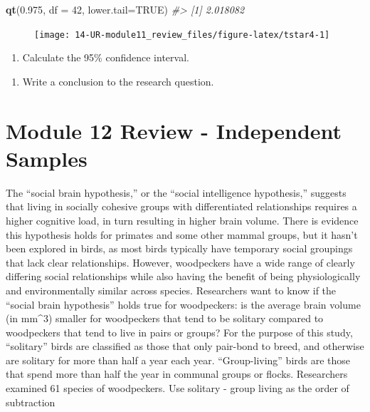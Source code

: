 \documentclass[
]{report}
\newenvironment{Shaded}{\begin{snugshade}}{\end{snugshade}}
\newcommand{\AttributeTok}[1]{\textcolor[rgb]{0.13,0.29,0.53}{#1}}
\newcommand{\CommentTok}[1]{\textcolor[rgb]{0.56,0.35,0.01}{\textit{#1}}}
\newcommand{\ConstantTok}[1]{\textcolor[rgb]{0.56,0.35,0.01}{#1}}
\newcommand{\DecValTok}[1]{\textcolor[rgb]{0.00,0.00,0.81}{#1}}
\newcommand{\FloatTok}[1]{\textcolor[rgb]{0.00,0.00,0.81}{#1}}
\newcommand{\FunctionTok}[1]{\textcolor[rgb]{0.13,0.29,0.53}{\textbf{#1}}}
\newcommand{\NormalTok}[1]{#1}
\providecommand{\tightlist}{%
  \setlength{\itemsep}{0pt}\setlength{\parskip}{0pt}}
\begin{document}
\begin{Shaded}
\begin{Highlighting}[]
\FunctionTok{qt}\NormalTok{(}\FloatTok{0.975}\NormalTok{, }\AttributeTok{df =} \DecValTok{42}\NormalTok{, }\AttributeTok{lower.tail=}\ConstantTok{TRUE}\NormalTok{)}
\CommentTok{\#\textgreater{} [1] 2.018082}
\end{Highlighting}
\end{Shaded}

\begin{figure}

{\centering \texttt{[image: 14-UR-module11\_review\_files/figure-latex/tstar4-1]} 

}

\end{figure}

\begin{enumerate}
\def\labelenumi{\arabic{enumi}.}
\setcounter{enumi}{15}
\tightlist
\item
  Calculate the 95\% confidence interval.
\end{enumerate}

\vspace{0.8in}

\begin{enumerate}
\def\labelenumi{\arabic{enumi}.}
\setcounter{enumi}{16}
\tightlist
\item
  Write a conclusion to the research question.
\end{enumerate}

\newpage

\section{Module 12 Review - Independent Samples}\label{module-12-review---independent-samples}

The ``social brain hypothesis,'' or the ``social intelligence hypothesis,'' suggests that living in socially cohesive groups with differentiated relationships requires a higher cognitive load, in turn resulting in higher brain volume. There is evidence this hypothesis holds for primates and some other mammal groups, but it hasn't been explored in birds, as most birds typically have temporary social groupings that lack clear relationships. However, woodpeckers have a wide range of clearly differing social relationships while also having the benefit of being physiologically and environmentally similar across species. Researchers want to know if the ``social brain hypothesis'' holds true for woodpeckers: is the average brain volume (in mm\^{}3) smaller for woodpeckers that tend to be solitary compared to woodpeckers that tend to live in pairs or groups? For the purpose of this study, ``solitary'' birds are classified as those that only pair-bond to breed, and otherwise are solitary for more than half a year each year. ``Group-living'' birds are those that spend more than half the year in communal groups or flocks. Researchers examined 61 species of woodpeckers. Use solitary - group living as the order of subtraction
\end{document}
